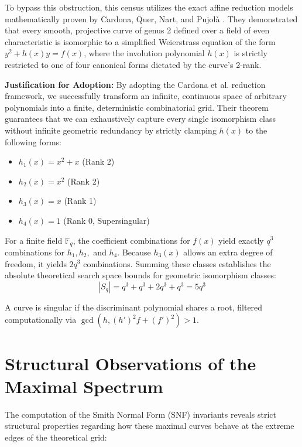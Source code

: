 \documentclass[11pt,letterpaper]{article}
\begin{document}
	To bypass this obstruction, this census utilizes the exact affine reduction models mathematically proven by Cardona, Quer, Nart, and Pujolà \cite{Cardona2005}. They demonstrated that every smooth, projective curve of genus 2 defined over a field of even characteristic is isomorphic to a simplified Weierstrass equation of the form $y^2 + h(x)y = f(x)$, where the involution polynomial $h(x)$ is strictly restricted to one of four canonical forms dictated by the curve's 2-rank.
	
	\textbf{Justification for Adoption:} By adopting the Cardona et al. reduction framework, we successfully transform an infinite, continuous space of arbitrary polynomials into a finite, deterministic combinatorial grid. Their theorem guarantees that we can exhaustively capture every single isomorphism class without infinite geometric redundancy by strictly clamping $h(x)$ to the following forms:
	\begin{itemize}
		\item $h_1(x) = x^2 + x$ (Rank 2) 
		\item $h_2(x) = x^2$ (Rank 2) 
		\item $h_3(x) = x$ (Rank 1) 
		\item $h_4(x) = 1$ (Rank 0, Supersingular)
	\end{itemize}
	
	For a finite field $\mathbb{F}_q$, the coefficient combinations for $f(x)$ yield exactly $q^3$ combinations for $h_1, h_2,$ and $h_4$. Because $h_3(x)$ allows an extra degree of freedom, it yields $2q^3$ combinations. Summing these classes establishes the absolute theoretical search space bounds for geometric isomorphism classes:
	$$|S_q| = q^3 + q^3 + 2q^3 + q^3 = 5q^3$$
	
	A curve is singular if the discriminant polynomial shares a root, filtered computationally via $\gcd(h, (h')^2f + (f')^2) > 1$.
	
	\section{Structural Observations of the Maximal Spectrum}
	The computation of the Smith Normal Form (SNF) invariants reveals strict structural properties regarding how these maximal curves behave at the extreme edges of the theoretical grid:
	
\end{document}
